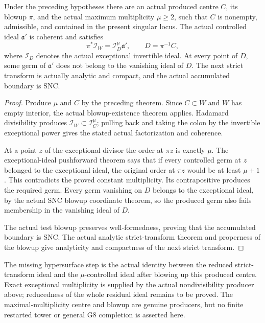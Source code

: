 \begin{theorem}
\label{hir:actual-high-multiplicity-blowup}
\leanok
Under the preceding hypotheses there are an actual produced centre $C$,
its blowup $\pi$, and the actual maximum multiplicity $\mu\geq2$, such that
$C$ is nonempty, admissible, and contained in the present singular locus.
The actual controlled ideal $\mathfrak a'$ is coherent and satisfies
\[
 \pi^*\mathcal I_W=\mathcal I_D^\mu\mathfrak a',
 \qquad D=\pi^{-1}C,
\]
where $\mathcal I_D$ denotes the actual exceptional invertible ideal.
At every point of $D$, some germ of $\mathfrak a'$ does not belong to
the vanishing ideal of $D$. The next strict transform is actually analytic
and compact, and the actual accumulated boundary is SNC.
\end{theorem}
\begin{proof}
Produce $\mu$ and $C$ by the preceding theorem. Since $C\subset W$ and
$W$ has empty interior, the actual blowup-existence theorem applies.
Hadamard divisibility produces $\mathcal I_W\subset\mathcal I_C^\mu$;
pulling back and taking the colon by the invertible exceptional power
gives the stated actual factorization and coherence.

At a point $z$ of the exceptional divisor the order at $\pi z$ is exactly
$\mu$. The exceptional-ideal pushforward theorem says that if every
controlled germ at $z$ belonged to the exceptional ideal, the original
order at $\pi z$ would be at least $\mu+1$. This contradicts the proved
constant multiplicity. Its contrapositive produces the required germ.
Every germ vanishing on $D$ belongs to the exceptional ideal, by the
actual SNC blowup coordinate theorem, so the produced germ also fails
membership in the vanishing ideal of $D$.

The actual test blowup preserves well-formedness, proving that the
accumulated boundary is SNC. The actual analytic strict-transform theorem
and properness of the blowup give analyticity and compactness of the next
strict transform.
\end{proof}

The missing hypersurface step is the actual identity between the reduced
strict-transform ideal and the $\mu$-controlled ideal after blowing up this
produced centre. Exact exceptional multiplicity is supplied by the actual
nondivisibility producer above; reducedness of the whole residual ideal
remains to be proved. The maximal-multiplicity centre and blowup are genuine producers,
but no finite restarted tower or general G8 completion is asserted here.
